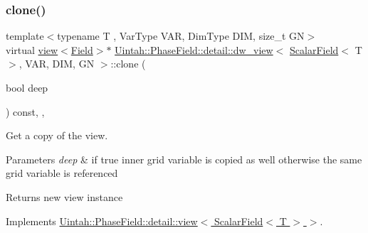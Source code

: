 \subsubsection{\texorpdfstring{clone()}{clone()}\hspace{0.1cm}{\footnotesize\ttfamily [1/2]}}
{\footnotesize\ttfamily template$<$typename T , Var\+Type V\+AR, Dim\+Type D\+IM, size\+\_\+t GN$>$ \\
virtual \hyperlink{classUintah_1_1PhaseField_1_1detail_1_1view}{view}$<$\hyperlink{structUintah_1_1PhaseField_1_1ScalarField}{Field}$>$$\ast$ \hyperlink{classUintah_1_1PhaseField_1_1detail_1_1dw__view}{Uintah\+::\+Phase\+Field\+::detail\+::dw\+\_\+view}$<$ \hyperlink{structUintah_1_1PhaseField_1_1ScalarField}{Scalar\+Field}$<$ T $>$, V\+AR, D\+IM, GN $>$\+::clone (\begin{DoxyParamCaption}\item[{bool}]{deep }\end{DoxyParamCaption}) const\hspace{0.3cm}{\ttfamily [inline]}, {\ttfamily [override]}, {\ttfamily [virtual]}}



Get a copy of the view. 


\begin{DoxyParams}{Parameters}
{\em deep} & if true inner grid variable is copied as well otherwise the same grid variable is referenced\\
\hline
\end{DoxyParams}
\begin{DoxyReturn}{Returns}
new view instance 
\end{DoxyReturn}


Implements \hyperlink{classUintah_1_1PhaseField_1_1detail_1_1view_3_01ScalarField_3_01T_01_4_01_4_a6e11243c9d776a7b703e524ea4151a16}{Uintah\+::\+Phase\+Field\+::detail\+::view$<$ Scalar\+Field$<$ T $>$ $>$}.

\mbox{\label{classUintah_1_1PhaseField_1_1detail_1_1dw__view_3_01ScalarField_3_01T_01_4_00_01VAR_00_01DIM_00_01GN_01_4_a47a3e1a15a57b331281c3c374e49bdc8}} 
